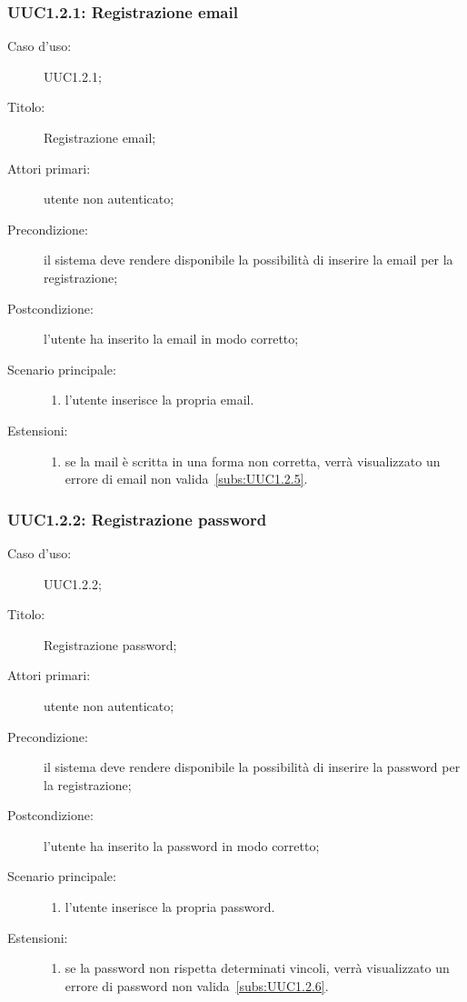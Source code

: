 \documentclass[../../../analisi-dei-requisiti.tex]{subfiles}
\begin{document}
\subsubsection{UUC1.2.1: Registrazione email}%
\label{subs:UUC1.2.1}
\begin{description}
  \item[Caso d’uso:] UUC1.2.1;
  \item[Titolo:] Registrazione email;
  \item[Attori primari:] utente non autenticato;
  \item[Precondizione:] il sistema deve rendere disponibile la possibilità di inserire la email per la registrazione;
  \item[Postcondizione:] l'utente ha inserito la email in modo corretto;
  \item[Scenario principale:]
        \begin{enumerate}
          \item l'utente inserisce la propria email.
        \end{enumerate}
  \item[Estensioni:]
        \begin{enumerate}
          \item se la mail è scritta in una forma non corretta, verrà visualizzato un errore di email non valida~\ref{subs:UUC1.2.5}.
        \end{enumerate}
\end{description}



\subsubsection{UUC1.2.2: Registrazione password}%
\label{subs:UUC1.2.2}
\begin{description}
  \item[Caso d’uso:] UUC1.2.2;
  \item[Titolo:] Registrazione password;
  \item[Attori primari:] utente non autenticato;
  \item[Precondizione:] il sistema deve rendere disponibile la possibilità di inserire la password per la registrazione;
  \item[Postcondizione:] l'utente ha inserito la password in modo corretto;
  \item[Scenario principale:]
        \begin{enumerate}
          \item l'utente inserisce la propria password.
        \end{enumerate}
  \item[Estensioni:]
        \begin{enumerate}
          \item se la password non rispetta determinati vincoli, verrà visualizzato un errore di password non valida~\ref{subs:UUC1.2.6}.
        \end{enumerate}
\end{description}
\end{document}
